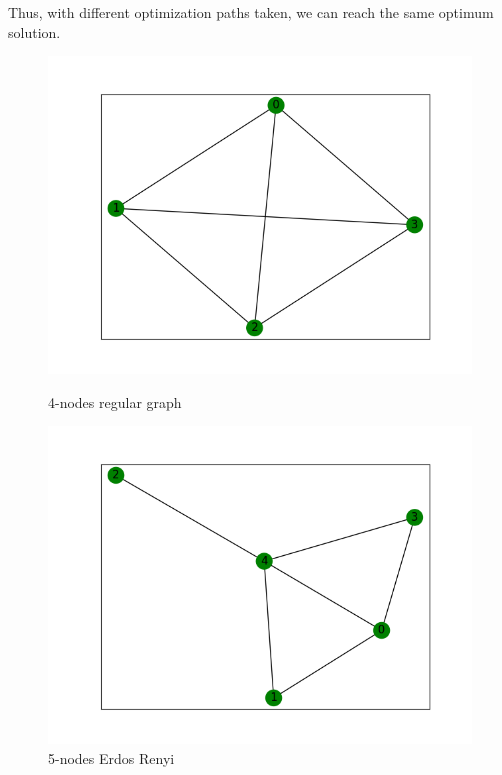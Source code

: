 Thus, with different optimization paths taken, we can reach the same optimum solution.
 
 \begin{figure}[h]
    \begin{minipage}{0.33\textwidth}
        \centering
        \includegraphics[width=\textwidth]{images/4ngraph.png}
        \caption{4-nodes regular graph}
        \label{fig:4n}
    \end{minipage}
    \begin{minipage}{0.33\textwidth}
        \centering
        \includegraphics[width=\textwidth]{images/erdos renyi n = 5.png}
        \caption{5-nodes Erdos Renyi}
        \label{fig:er5}
    \end{minipage}

\end{figure}

